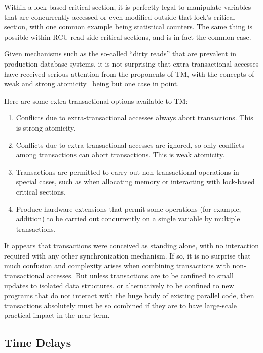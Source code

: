 Within a lock-based critical section, it is perfectly legal to manipulate
variables that are concurrently accessed or even modified outside that
lock's critical section, with one common example being statistical
counters.
The same thing is possible within RCU read-side critical
sections, and is in fact the common case.

Given mechanisms such as the so-called ``dirty reads'' that are
prevalent in production database systems, it is not surprising
that extra-transactional accesses have received serious attention
from the proponents of TM, with the concepts of weak and strong
atomicity~\cite{Blundell2006TMdeadlock} being but one case in point.

Here are some extra-transactional options available to TM:

\begin{enumerate}
\item	Conflicts due to extra-transactional accesses always abort
	transactions.
	This is strong atomicity.
\item	Conflicts due to extra-transactional accesses are ignored,
	so only conflicts among transactions can abort transactions.
	This is weak atomicity.
\item	Transactions are permitted to carry out non-transactional
	operations in special cases, such as when allocating memory or
	interacting with lock-based critical sections.
\item	Produce hardware extensions that permit some operations
	(for example, addition) to be carried out concurrently on a
	single variable by multiple transactions.
\end{enumerate}

It appears that transactions were conceived as standing alone, with no
interaction required with any other synchronization mechanism.
If so, it is no surprise that much confusion and complexity arises when
combining transactions with non-transactional accesses.
But unless transactions are to be confined to small updates to isolated
data structures, or alternatively to be confined to new programs
that do not interact with the huge body of existing parallel code,
then transactions absolutely must be so combined if they are to have
large-scale practical impact in the near term.

\subsection{Time Delays}
\label{sec:future:Time Delays}

